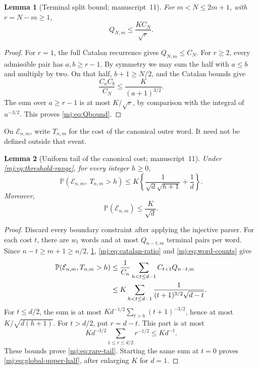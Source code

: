 \documentclass[11pt,a4paper]{article}
\newtheorem{lemma}[lemma]{Lemma}
\theoremstyle{definition}\newaliascnt{definition}{theorem}
\theoremstyle{remark}\newaliascnt{remark}{theorem}
\newcommand{\ljP}{\mathbb P}
\begin{document}
\begin{lemma}[Terminal split bound; manuscript~11]
\label{mj:lem:Q}
For $m<N\le2m+1$, with $r=N-m\ge1$,
\begin{equation}
 Q_{N,m}\le\frac{K C_N}{\sqrt r}.
 \label{mj:eq:Qbound}
\end{equation}
\end{lemma}
\begin{proof}
For $r=1$, the full Catalan recurrence gives $Q_{N,m}\le C_N$. For $r\ge2$,
every admissible pair has $a,b\ge r-1$. By symmetry we may sum the half with
$a\le b$ and multiply by two. On that half, $b+1\ge N/2$, and the Catalan
bounds give
\[
 \frac{C_aC_b}{C_N}\le\frac{K}{(a+1)^{3/2}}.
\]
The sum over $a\ge r-1$ is at most $K/\sqrt r$, by comparison with the
integral of $u^{-3/2}$. This proves \eqref{mj:eq:Qbound}.
\end{proof}

On $\mathcal E_{n,m}$, write $T_{n,m}$ for the cost of the canonical outer
word. It need not be defined outside that event.

\begin{lemma}[Uniform tail of the canonical cost; manuscript~11]
\label{mj:lem:cost-tail}
Under \eqref{mj:eq:threshold-range}, for every integer $h\ge0$,
\begin{equation}
 \ljP(\mathcal E_{n,m},\ T_{n,m}>h)
 \le K\left\{\frac{1}{\sqrt d\sqrt{h+1}}+\frac1d\right\}.
 \label{mj:eq:rare-tail}
\end{equation}
Moreover,
\begin{equation}
 \ljP(\mathcal E_{n,m})\le\frac{K}{\sqrt d}.
 \label{mj:eq:global-upper-half}
\end{equation}
\end{lemma}
\begin{proof}
Discard every boundary constraint after applying the injective parser. For
each cost $t$, there are $w_t$ words and at most $Q_{n-t,m}$ terminal pairs
per word. Since $n-t\ge m+1\ge n/2$, \cref{mj:lem:Q},
\eqref{mj:eq:catalan-ratio} and \eqref{mj:eq:word-counts} give
\begin{align}
 \ljP(\mathcal E_{n,m},T_{n,m}>h)
 &\le \frac1{C_n}\sum_{h<t\le d-1}C_{t+1}Q_{n-t,m}\notag\\
 &\le K\sum_{h<t\le d-1}
       \frac{1}{(t+1)^{3/2}\sqrt{d-t}}.
 \label{mj:eq:convolution-bound}
\end{align}
For $t\le d/2$, the sum is at most $Kd^{-1/2}\sum_{t>h}(t+1)^{-3/2}$, hence
at most $K/\sqrt{d(h+1)}$. For $t>d/2$, put $r=d-t$. This part is at most
\[
 Kd^{-3/2}\sum_{1\le r\le d/2}r^{-1/2}\le Kd^{-1}.
\]
These bounds prove \eqref{mj:eq:rare-tail}. Starting the same sum at $t=0$
proves \eqref{mj:eq:global-upper-half}, after enlarging $K$ for $d=1$.
\end{proof}
\end{document}
